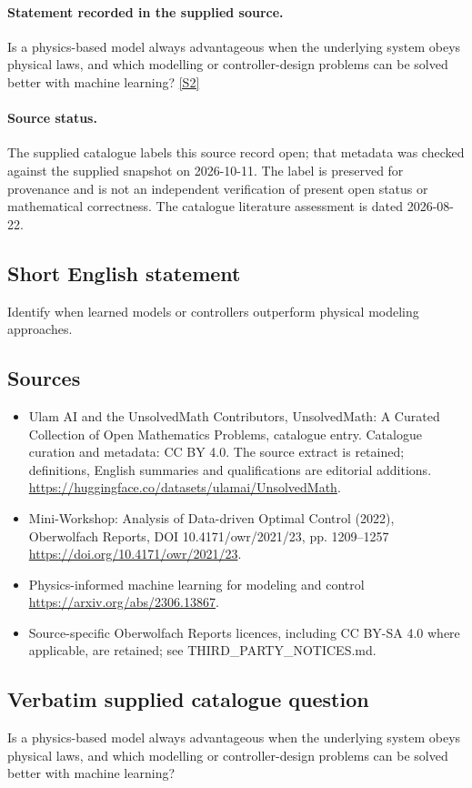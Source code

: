 \documentclass[11pt]{article}
\begin{document}
\paragraph{Statement recorded in the supplied source.}
Is a physics-based model always advantageous when the underlying system obeys physical laws, and which modelling or controller-design problems can be solved better with machine learning? \href{https://doi.org/10.4171/owr/2021/23}{[S2]}
\paragraph{Source status.}
The supplied catalogue labels this source record open; that metadata was checked against the supplied snapshot on 2026-10-11. The label is preserved for provenance and is not an independent verification of present open status or mathematical correctness. The catalogue literature assessment is dated 2026-08-22.
\subsection{Short English statement}
Identify when learned models or controllers outperform physical modeling approaches.
\subsection{Sources}
\begin{itemize}
\item[S1] Ulam AI and the UnsolvedMath Contributors, UnsolvedMath: A Curated Collection of Open Mathematics Problems, catalogue entry. Catalogue curation and metadata: CC BY 4.0. The source extract is retained; definitions, English summaries and qualifications are editorial additions.
\url{https://huggingface.co/datasets/ulamai/UnsolvedMath}.
\item[S2] Mini-Workshop: Analysis of Data-driven Optimal Control (2022), Oberwolfach Reports, DOI 10.4171/owr/2021/23, pp. 1209--1257
\url{https://doi.org/10.4171/owr/2021/23}.
\item[S3] Physics-informed machine learning for modeling and control
\url{https://arxiv.org/abs/2306.13867}.
\item Source-specific Oberwolfach Reports licences, including CC BY-SA 4.0 where applicable, are retained; see THIRD\_PARTY\_NOTICES.md.
\end{itemize}
\subsection{Verbatim supplied catalogue question}
Is a physics-based model always advantageous when the underlying system obeys physical laws, and which modelling or controller-design problems can be solved better with machine learning?
\end{document}
